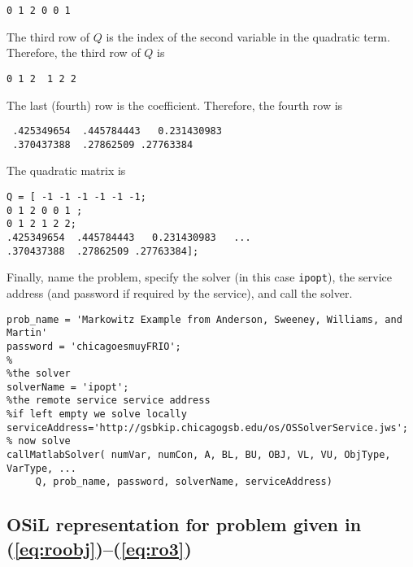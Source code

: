 \documentclass[11pt]{article}
\renewcommand{\_}{{\char"5F}}
\renewcommand{\{}{{\char"7B}}
\renewcommand{\}}{{\char"7D}}
\renewcommand{\^}{{\char"0D}}
\renewcommand{\'}{{\char"0D}}
\begin{document}
\begin{verbatim}
0 1 2 0 0 1
\end{verbatim} 



The third row of $Q$ is the index of the second variable in the quadratic term.   Therefore, the third row of $Q$ is



\begin{verbatim}
0 1 2  1 2 2
\end{verbatim} 



The last (fourth) row is the coefficient. Therefore, the fourth row is





\begin{verbatim}
 .425349654  .445784443   0.231430983   
 .370437388  .27862509 .27763384
\end{verbatim}


The quadratic matrix is



\begin{verbatim}
Q = [ -1 -1 -1 -1 -1 -1;
0 1 2 0 0 1 ;
0 1 2 1 2 2;
.425349654  .445784443   0.231430983   ...
.370437388  .27862509 .27763384];
\end{verbatim}


Finally, name the problem, specify the solver (in this case {\tt ipopt}), the service address (and password if required by the service), and call the solver.



\begin{verbatim}
prob_name = 'Markowitz Example from Anderson, Sweeney, Williams, and Martin'
password = 'chicagoesmuyFRIO';
%
%the solver
solverName = 'ipopt';
%the remote service service address
%if left empty we solve locally
serviceAddress='http://gsbkip.chicagogsb.edu/os/OSSolverService.jws';
% now solve
callMatlabSolver( numVar, numCon, A, BL, BU, OBJ, VL, VU, ObjType, VarType, ...
     Q, prob_name, password, solverName, serviceAddress)
\end{verbatim}




\subsection{OSiL representation for problem given in 
(\ref{eq:roobj})--(\ref{eq:ro3})}\label{section:rosenbrockXML}
\end{document}
